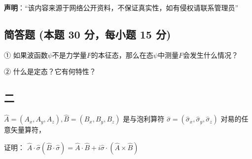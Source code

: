 
\textbf{声明}：“该内容来源于网络公开资料，不保证真实性，如有侵权请联系管理员”

\subsection{简答题 (本题 30 分，每小题 15 分)}

① 如果波函数$\psi$不是力学量$F$的本征态，那么在态$\psi$中测量$F$会发生什么情况？

② 什么是定态？它有何特性？

\subsection{二}
$\hat{A} = (A_x, A_y, A_z), \hat{B} = (B_x, B_y, B_z)$ 是与泡利算符 $\hat{\sigma} = (\hat{\sigma}_x, \hat{\sigma}_y, \hat{\sigma}_z)$ 对易的任意矢量算符，

证明：
$\hat{A} \cdot \hat{\sigma}(\hat{B} \cdot \hat{\sigma}) = \hat{A} \cdot \hat{B} + i \hat{\sigma} \cdot (\hat{A} \times \hat{B})$